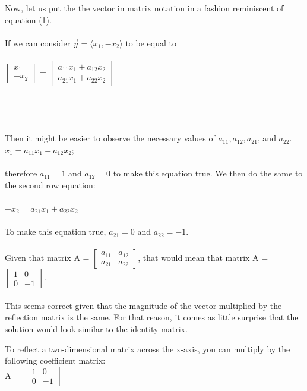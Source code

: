 Now, let us put the the vector in matrix notation in a fashion reminiscent of equation (1).\\\\If we can consider $\vec{y} = \langle{x_1},-x_2\rangle$ to be equal to\\\\ $\left[\begin{array}{c} x_1 \\ -x_2\end{array}\right]$ = $\left[\begin{array}{c} a_{11}x_1 + a_{12}x_2\\a_{21}x_1 + a_{22} x_2\end{array}\right]$ \\\\\\\\\\
Then it might be easier to observe the necessary values of $a_{11},a_{12},a_{21}$, and $a_{22}$.\\

$x_1 = a_{11}x_1 + a_{12}x_2$;\\\\ therefore $a_{11} = 1$ and $a_{12} = 0$ to make this equation true. We then do the same to the second row equation:\\\\
$-x_2 = a_{21}x_1 + a_{22}x_2$\\\\To make this equation true, $a_{21} = 0$ and $a_{22} = -1$.\\\\Given that matrix A = $\left[\begin{array}{cc}
a_{11} & a_{12} \\ a_{21} & a_{22} \end{array}\right]$, that would mean that matrix A =$\left[\begin{array}{cc}
1 & 0 \\ 0 & -1 \end{array}\right]$.\\\\This seems correct given that the magnitude of the vector multiplied by the reflection matrix is the same. For that reason, it comes as little surprise that the solution would look similar to the identity matrix.
\\
\begin{center}
To reflect a two-dimensional matrix across the x-axis, you can multiply by the following coefficient matrix:\\
A = $\left[\begin{array}{cc}
1 & 0 \\ 0 & -1 \end{array}\right]$ 

\end{center}

